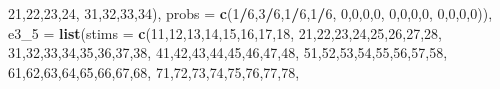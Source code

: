 \documentclass[,man,floatsintext]{apa6}
\newenvironment{Shaded}{\begin{snugshade}}{\end{snugshade}}
\newcommand{\DataTypeTok}[1]{\textcolor[rgb]{0.13,0.29,0.53}{#1}}
\newcommand{\DecValTok}[1]{\textcolor[rgb]{0.00,0.00,0.81}{#1}}
\newcommand{\KeywordTok}[1]{\textcolor[rgb]{0.13,0.29,0.53}{\textbf{#1}}}
\newcommand{\NormalTok}[1]{#1}
\newcommand{\OperatorTok}[1]{\textcolor[rgb]{0.81,0.36,0.00}{\textbf{#1}}}
\begin{document}
\begin{Shaded}
\begin{Highlighting}[]
                         \DecValTok{21}\NormalTok{,}\DecValTok{22}\NormalTok{,}\DecValTok{23}\NormalTok{,}\DecValTok{24}\NormalTok{,}
                         \DecValTok{31}\NormalTok{,}\DecValTok{32}\NormalTok{,}\DecValTok{33}\NormalTok{,}\DecValTok{34}\NormalTok{),}
               \DataTypeTok{probs =} \KeywordTok{c}\NormalTok{(}\DecValTok{1}\OperatorTok{/}\DecValTok{6}\NormalTok{,}\DecValTok{3}\OperatorTok{/}\DecValTok{6}\NormalTok{,}\DecValTok{1}\OperatorTok{/}\DecValTok{6}\NormalTok{,}\DecValTok{1}\OperatorTok{/}\DecValTok{6}\NormalTok{,}
                         \DecValTok{0}\NormalTok{,}\DecValTok{0}\NormalTok{,}\DecValTok{0}\NormalTok{,}\DecValTok{0}\NormalTok{,}
                         \DecValTok{0}\NormalTok{,}\DecValTok{0}\NormalTok{,}\DecValTok{0}\NormalTok{,}\DecValTok{0}\NormalTok{,}
                         \DecValTok{0}\NormalTok{,}\DecValTok{0}\NormalTok{,}\DecValTok{0}\NormalTok{,}\DecValTok{0}\NormalTok{)),}
  \DataTypeTok{e3_5 =}  \KeywordTok{list}\NormalTok{(}\DataTypeTok{stims =} \KeywordTok{c}\NormalTok{(}\DecValTok{11}\NormalTok{,}\DecValTok{12}\NormalTok{,}\DecValTok{13}\NormalTok{,}\DecValTok{14}\NormalTok{,}\DecValTok{15}\NormalTok{,}\DecValTok{16}\NormalTok{,}\DecValTok{17}\NormalTok{,}\DecValTok{18}\NormalTok{,}
                         \DecValTok{21}\NormalTok{,}\DecValTok{22}\NormalTok{,}\DecValTok{23}\NormalTok{,}\DecValTok{24}\NormalTok{,}\DecValTok{25}\NormalTok{,}\DecValTok{26}\NormalTok{,}\DecValTok{27}\NormalTok{,}\DecValTok{28}\NormalTok{,}
                         \DecValTok{31}\NormalTok{,}\DecValTok{32}\NormalTok{,}\DecValTok{33}\NormalTok{,}\DecValTok{34}\NormalTok{,}\DecValTok{35}\NormalTok{,}\DecValTok{36}\NormalTok{,}\DecValTok{37}\NormalTok{,}\DecValTok{38}\NormalTok{,}
                         \DecValTok{41}\NormalTok{,}\DecValTok{42}\NormalTok{,}\DecValTok{43}\NormalTok{,}\DecValTok{44}\NormalTok{,}\DecValTok{45}\NormalTok{,}\DecValTok{46}\NormalTok{,}\DecValTok{47}\NormalTok{,}\DecValTok{48}\NormalTok{,}
                         \DecValTok{51}\NormalTok{,}\DecValTok{52}\NormalTok{,}\DecValTok{53}\NormalTok{,}\DecValTok{54}\NormalTok{,}\DecValTok{55}\NormalTok{,}\DecValTok{56}\NormalTok{,}\DecValTok{57}\NormalTok{,}\DecValTok{58}\NormalTok{,}
                         \DecValTok{61}\NormalTok{,}\DecValTok{62}\NormalTok{,}\DecValTok{63}\NormalTok{,}\DecValTok{64}\NormalTok{,}\DecValTok{65}\NormalTok{,}\DecValTok{66}\NormalTok{,}\DecValTok{67}\NormalTok{,}\DecValTok{68}\NormalTok{,}
                         \DecValTok{71}\NormalTok{,}\DecValTok{72}\NormalTok{,}\DecValTok{73}\NormalTok{,}\DecValTok{74}\NormalTok{,}\DecValTok{75}\NormalTok{,}\DecValTok{76}\NormalTok{,}\DecValTok{77}\NormalTok{,}\DecValTok{78}\NormalTok{,}

\end{Highlighting}
\end{Shaded}
\end{document}
